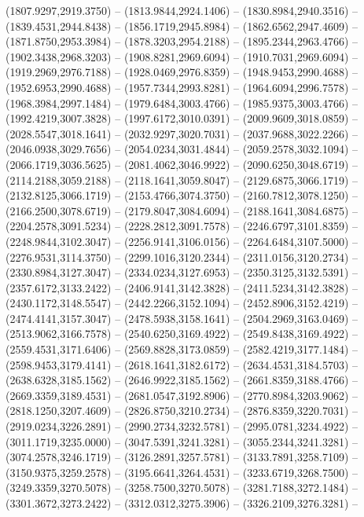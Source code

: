 \begin{scope}[y=0.80pt, x=0.80pt, yscale=-1.000000, xscale=1.000000, inner sep=0pt, outer sep=0pt]
    (1807.9297,2919.3750) -- (1813.9844,2924.1406) -- (1830.8984,2940.3516) --
    (1839.4531,2944.8438) -- (1856.1719,2945.8984) -- (1862.6562,2947.4609) --
    (1871.8750,2953.3984) -- (1878.3203,2954.2188) -- (1895.2344,2963.4766) --
    (1902.3438,2968.3203) -- (1908.8281,2969.6094) -- (1910.7031,2969.6094) --
    (1919.2969,2976.7188) -- (1928.0469,2976.8359) -- (1948.9453,2990.4688) --
    (1952.6953,2990.4688) -- (1957.7344,2993.8281) -- (1964.6094,2996.7578) --
    (1968.3984,2997.1484) -- (1979.6484,3003.4766) -- (1985.9375,3003.4766) --
    (1992.4219,3007.3828) -- (1997.6172,3010.0391) -- (2009.9609,3018.0859) --
    (2028.5547,3018.1641) -- (2032.9297,3020.7031) -- (2037.9688,3022.2266) --
    (2046.0938,3029.7656) -- (2054.0234,3031.4844) -- (2059.2578,3032.1094) --
    (2066.1719,3036.5625) -- (2081.4062,3046.9922) -- (2090.6250,3048.6719) --
    (2114.2188,3059.2188) -- (2118.1641,3059.8047) -- (2129.6875,3066.1719) --
    (2132.8125,3066.1719) -- (2153.4766,3074.3750) -- (2160.7812,3078.1250) --
    (2166.2500,3078.6719) -- (2179.8047,3084.6094) -- (2188.1641,3084.6875) --
    (2204.2578,3091.5234) -- (2228.2812,3091.7578) -- (2246.6797,3101.8359) --
    (2248.9844,3102.3047) -- (2256.9141,3106.0156) -- (2264.6484,3107.5000) --
    (2276.9531,3114.3750) -- (2299.1016,3120.2344) -- (2311.0156,3120.2734) --
    (2330.8984,3127.3047) -- (2334.0234,3127.6953) -- (2350.3125,3132.5391) --
    (2357.6172,3133.2422) -- (2406.9141,3142.3828) -- (2411.5234,3142.3828) --
    (2430.1172,3148.5547) -- (2442.2266,3152.1094) -- (2452.8906,3152.4219) --
    (2474.4141,3157.3047) -- (2478.5938,3158.1641) -- (2504.2969,3163.0469) --
    (2513.9062,3166.7578) -- (2540.6250,3169.4922) -- (2549.8438,3169.4922) --
    (2559.4531,3171.6406) -- (2569.8828,3173.0859) -- (2582.4219,3177.1484) --
    (2598.9453,3179.4141) -- (2618.1641,3182.6172) -- (2634.4531,3184.5703) --
    (2638.6328,3185.1562) -- (2646.9922,3185.1562) -- (2661.8359,3188.4766) --
    (2669.3359,3189.4531) -- (2681.0547,3192.8906) -- (2770.8984,3203.9062) --
    (2818.1250,3207.4609) -- (2826.8750,3210.2734) -- (2876.8359,3220.7031) --
    (2919.0234,3226.2891) -- (2990.2734,3232.5781) -- (2995.0781,3234.4922) --
    (3011.1719,3235.0000) -- (3047.5391,3241.3281) -- (3055.2344,3241.3281) --
    (3074.2578,3246.1719) -- (3126.2891,3257.5781) -- (3133.7891,3258.7109) --
    (3150.9375,3259.2578) -- (3195.6641,3264.4531) -- (3233.6719,3268.7500) --
    (3249.3359,3270.5078) -- (3258.7500,3270.5078) -- (3281.7188,3272.1484) --
    (3301.3672,3273.2422) -- (3312.0312,3275.3906) -- (3326.2109,3276.3281) --

\end{scope}

